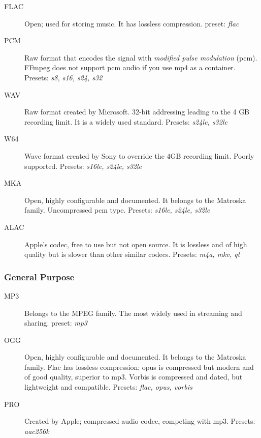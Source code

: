 \begin{description}
	\item[FLAC] Open; used for storing music. It has lossless compression.
	\newline    preset: \textit{flac}
	\item[PCM] Raw format that encodes the signal with \textit{modified pulse modulation} (pcm). FFmpeg does not support pcm audio if you use mp4 as a container.
	\newline    Presets: \textit{s8, s16, s24, s32}
	\item[WAV] Raw format created by Microsoft. 32-bit addressing leading to the 4 GB recording limit. It is a widely used standard.
	\newline    Presets: \textit{s24le, s32le}
	\item[W64] Wave format created by Sony to override the 4GB recording limit. Poorly supported.
	\newline    Presets: \textit{s16le, s24le, s32le}
	\item[MKA] Open, highly configurable and documented. It belongs to the Matroska family. Uncompressed pcm type.
	\newline    Presets: \textit{s16le, s24le, s32le}
	\item[ALAC] Apple's codec, free to use but not open source. It is lossless and of high quality but is slower than other similar codecs.
	\newline	Presets: \textit{m4a, mkv, qt}
\end{description}

\subsubsection{General Purpose}
\label{ssub:ffmpeg_audio_general_purpose}

\begin{description}
	\item[MP3] Belongs to the MPEG family. The most widely used in streaming and sharing.
	\newline   preset: \textit{mp3}
	\item[OGG] Open, highly configurable and documented. It belongs to the Matroska family. Flac has lossless compression; opus is compressed but modern and of good quality, superior to mp3. Vorbis is compressed and dated, but lightweight and compatible.
	\newline    Presets: \textit{flac, opus, vorbis}
	\item[PRO] Created by Apple; compressed audio codec, competing with mp3.
	\newline    Presets: \textit{aac256k}
\end{description}

